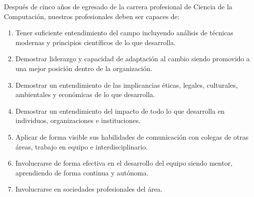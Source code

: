 Después de cinco años de egresado de la carrera profesional de Ciencia de la Computación, nuestros profesionales deben ser capaces de:
\begin{enumerate}
\item Tener suficiente entendimiento del campo incluyendo análisis de técnicas modernas y principios científicos de lo que desarrolla.
\item Demostrar liderazgo y capacidad de adaptación al cambio siendo promovido a una mejor posición dentro de la organización.
\item Demostrar un entendimiento de las implicancias éticas, legales, culturales, ambientales y económicas de lo que desarrolla.
\item Demostrar un entendimiento del impacto de todo lo que desarrolla en individuos, organizaciones e instituciones.
\item Aplicar de forma visible sus habilidades de comunicación con colegas de otras áreas, trabajo en equipo e interdisciplinario.
\item Involucrarse de forma efectiva en el desarrollo del equipo siendo mentor, aprendiendo de forma continua y autónoma.
\item Involucrarse en sociedades profesionales del área.
\end{enumerate}